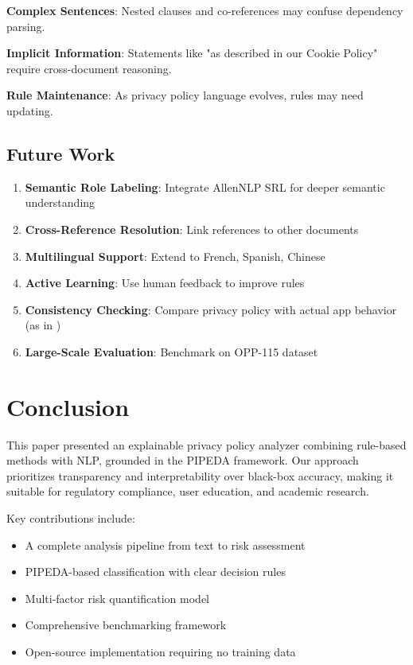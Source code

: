 \documentclass[conference]{IEEEtran}
\begin{document}
\textbf{Complex Sentences}: Nested clauses and co-references may confuse dependency parsing.

\textbf{Implicit Information}: Statements like "as described in our Cookie Policy" require cross-document reasoning.

\textbf{Rule Maintenance}: As privacy policy language evolves, rules may need updating.

\subsection{Future Work}

\begin{enumerate}
    \item \textbf{Semantic Role Labeling}: Integrate AllenNLP SRL for deeper semantic understanding
    \item \textbf{Cross-Reference Resolution}: Link references to other documents
    \item \textbf{Multilingual Support}: Extend to French, Spanish, Chinese
    \item \textbf{Active Learning}: Use human feedback to improve rules
    \item \textbf{Consistency Checking}: Compare privacy policy with actual app behavior (as in \cite{android-gdpr})
    \item \textbf{Large-Scale Evaluation}: Benchmark on OPP-115 dataset
\end{enumerate}

\section{Conclusion}

This paper presented an explainable privacy policy analyzer combining rule-based methods with NLP, grounded in the PIPEDA framework. Our approach prioritizes transparency and interpretability over black-box accuracy, making it suitable for regulatory compliance, user education, and academic research.

Key contributions include:
\begin{itemize}
    \item A complete analysis pipeline from text to risk assessment
    \item PIPEDA-based classification with clear decision rules
    \item Multi-factor risk quantification model
    \item Comprehensive benchmarking framework
    \item Open-source implementation requiring no training data
\end{itemize}
\end{document}
